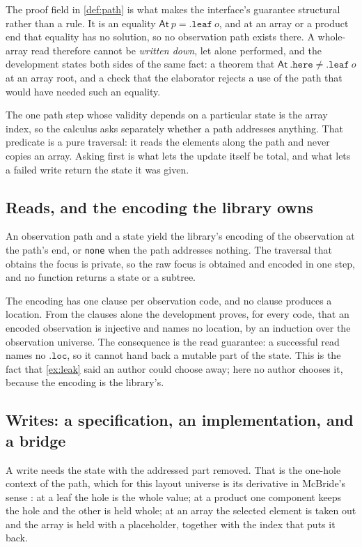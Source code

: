 \documentclass[11pt,a4paper]{article}
\theoremstyle{definition}
\theoremstyle{plain}
\newcommand{\code}[1]{\texttt{#1}}
\begin{document}
The proof field in \cref{def:path} is what makes the interface's guarantee
structural rather than a rule. It is an equality
$\mathsf{At}\ p = \mathtt{.leaf}\ o$, and at an array or a product end
that equality has no solution, so no observation path exists there. A
whole-array read therefore cannot be \emph{written down}, let alone performed,
and the development states both sides of the same fact: a theorem that
$\mathsf{At}\ \mathtt{.here} \ne \mathtt{.leaf}\ o$ at an array root, and a
check that the elaborator rejects a use of the path that would have needed such
an equality.

The one path step whose validity depends on a particular state is the array
index, so the calculus asks separately whether a path addresses anything. That
predicate is a pure traversal: it reads the elements along the path and never
copies an array. Asking first is what lets the update itself be total, and what
lets a failed write return the state it was given.

\subsection{Reads, and the encoding the library owns}

An observation path and a state yield the library's encoding of the observation
at the path's end, or \code{none} when the path addresses nothing. The traversal
that obtains the focus is private, so the raw focus is obtained and encoded in
one step, and no function returns a state or a subtree.

The encoding has one clause per observation code, and no clause produces a
location. From the clauses alone the development proves, for every code, that an
encoded observation is injective and names no location, by an induction over the
observation universe. The consequence is the read guarantee: a successful read
names no $\code{.loc}$, so it cannot hand back a mutable part of the state. This
is the fact that \cref{ex:leak} said an author could choose away; here no author
chooses it, because the encoding is the library's.

\subsection{Writes: a specification, an implementation, and a bridge}

A write needs the state with the addressed part removed. That is the one-hole
context of the path, which for this layout universe is its derivative in
McBride's sense \cite{huet1997zipper,mcbride2001derivative}: at a leaf the hole
is the whole value; at a product one component keeps the hole and the other is
held whole; at an array the selected element is taken out and the array is held
with a placeholder, together with the index that puts it back.
\end{document}
